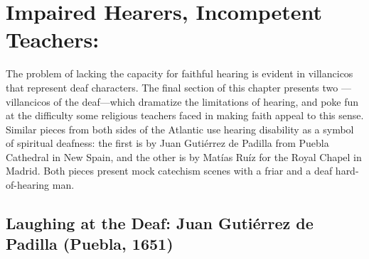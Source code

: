 \section{Impaired Hearers, Incompetent Teachers: }

The problem of lacking the capacity for faithful hearing is evident in
villancicos that represent deaf characters.
The final section of this chapter presents two ---villancicos of the deaf---which dramatize the limitations of hearing, and poke fun at the difficulty some religious teachers faced in making faith appeal to this sense.
Similar pieces from both sides of the Atlantic use hearing disability as a symbol of spiritual deafness: the first is by Juan Gutiérrez de Padilla from Puebla Cathedral in New Spain, and the other is by Matías Ruíz for the Royal Chapel in Madrid.
Both pieces present mock catechism scenes with a friar and a deaf hard-of-hearing man.

\subsection{Laughing at the Deaf: Juan Gutiérrez de Padilla (Puebla, 1651)}

